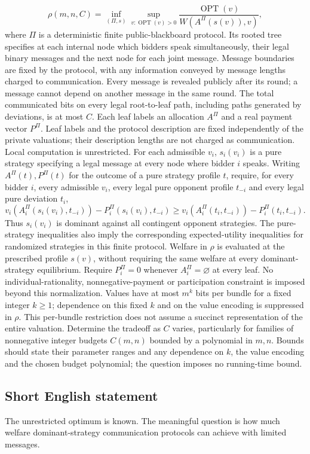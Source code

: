 \documentclass[11pt,a4paper]{article}
\begin{document}
\[
 \rho(m,n,C)=\inf_{(\Pi,s)}\sup_{v:\operatorname{OPT}(v)>0}
 \frac{\operatorname{OPT}(v)}{W(A^\Pi(s(v)),v)},
\]
where $\Pi$ is a deterministic finite public-blackboard protocol. Its rooted tree specifies at each internal node which bidders speak simultaneously, their legal binary messages and the next node for each joint message. Message boundaries are fixed by the protocol, with any information conveyed by message lengths charged to communication. Every message is revealed publicly after its round; a message cannot depend on another message in the same round. The total communicated bits on every legal root-to-leaf path, including paths generated by deviations, is at most $C$. Each leaf labels an allocation $A^\Pi$ and a real payment vector $P^\Pi$. Leaf labels and the protocol description are fixed independently of the private valuations; their description lengths are not charged as communication. Local computation is unrestricted.
For each admissible $v_i$, $s_i(v_i)$ is a pure strategy specifying a legal message at every node where bidder $i$ speaks. Writing $A^\Pi(t),P^\Pi(t)$ for the outcome of a pure strategy profile $t$, require, for every bidder $i$, every admissible $v_i$, every legal pure opponent profile $t_{-i}$ and every legal pure deviation $t_i$,
\[
 v_i(A_i^\Pi(s_i(v_i),t_{-i}))-P_i^\Pi(s_i(v_i),t_{-i})
 \geq v_i(A_i^\Pi(t_i,t_{-i}))-P_i^\Pi(t_i,t_{-i}).
\]
Thus $s_i(v_i)$ is dominant against all contingent opponent strategies. The pure-strategy inequalities also imply the corresponding expected-utility inequalities for randomized strategies in this finite protocol. Welfare in $\rho$ is evaluated at the prescribed profile $s(v)$, without requiring the same welfare at every dominant-strategy equilibrium. Require $P_i^\Pi=0$ whenever $A_i^\Pi=\varnothing$ at every leaf. No individual-rationality, nonnegative-payment or participation constraint is imposed beyond this normalization. Values have at most $m^k$ bits per bundle for a fixed integer $k\geq1$; dependence on this fixed $k$ and on the value encoding is suppressed in $\rho$. This per-bundle restriction does not assume a succinct representation of the entire valuation. Determine the tradeoff as $C$ varies, particularly for families of nonnegative integer budgets $C(m,n)$ bounded by a polynomial in $m,n$. Bounds should state their parameter ranges and any dependence on $k$, the value encoding and the chosen budget polynomial; the question imposes no running-time bound.
\subsection*{Short English statement}
The unrestricted optimum is known. The meaningful question is how much welfare dominant-strategy communication protocols can achieve with limited messages.
\end{document}

